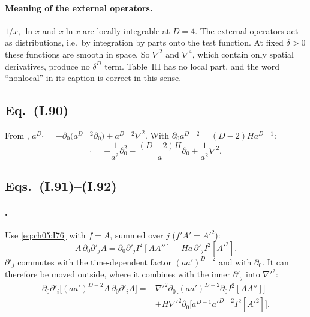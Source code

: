 \paragraph{Meaning of the external operators.}
$1/x$, $\ln x$ and $x\ln x$ are locally integrable at $D=4$. The external operators act as distributions, i.e.\ by integration by parts onto the test function.
At fixed $\delta>0$ these functions are smooth in space. So $\nabla^2$ and $\nabla^4$, which contain only spatial derivatives, produce no $\delta^D$ term.
Table~III has no local part, and the word ``nonlocal'' in its caption is correct in this sense.

\subsection[Eq. (I.90)]{Eq.~(I.90) \tD}

From , $a^D\square=-\partial_0\big(a^{D-2}\partial_0\big)+a^{D-2}\nabla^2$. With $\partial_0a^{D-2}=(D-2)Ha^{D-1}$:
\begin{equation}
\square=-\frac1{a^2}\partial_0^2-\frac{(D-2)H}{a}\partial_0+\frac1{a^2}\nabla^2 .
\tag{I.90}\label{eq:ch05:I90}
\end{equation}

\subsection[Eqs. (I.91)--(I.92)]{Eqs.~(I.91)--(I.92) \tD}
\label{sec:ch05:t12:91}

\paragraph{.} Use \eqref{eq:ch05:I76} with $f=A$, summed over $j$ ($f'A'=A'^2$):
\begin{equation*}
A\,\partial_0\partial'_jA=\partial_0\partial'_jI^2[AA'']+Ha\,\partial'_jI^2[A'^2].
\end{equation*}
$\partial'_j$ commutes with the time-dependent factor $(aa')^{D-2}$ and with $\partial_0$. It can therefore be moved outside, where it combines with the inner $\partial'_j$ into $\nabla'^2$:
\begin{equation}
\begin{aligned}
\partial_0\partial'_i\big[(aa')^{D-2}A\,\partial_0\partial'_iA\big]={}&\nabla'^2\partial_0\big[(aa')^{D-2}\partial_0I^2[AA'']\big]\\
&+H\nabla'^2\partial_0\big[a^{D-1}a'^{D-2}I^2[A'^2]\big].
\end{aligned}
\tag{I.91}\label{eq:ch05:I91}
\end{equation}

